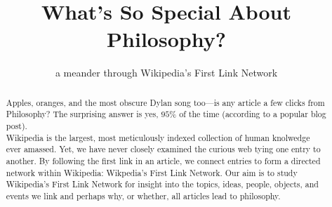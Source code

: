 \documentclass[twoside]{article}
\title{\vspace{-5mm}%
	\fontsize{24pt}{12pt}\selectfont
	\textbf{What's So Special About Philosophy?} 
	}
\author{
\fontsize{14pt}{14pt}\selectfont
	a meander through Wikipedia's First Link Network \vspace{-2mm}
	}
\date{}
\begin{document}
\maketitle
\thispagestyle{fancy}

\begin{abstract}
\fontsize{12pt}{12pt}\selectfont
\noindent Apples, oranges, and the most obscure Dylan song too---is any article a few clicks from Philosophy? The surprising answer is yes, $95\%$ of the time (according to a popular blog post).\\

Wikipedia is the largest, most meticulously indexed collection of human knolwedge ever amassed. Yet, we have never closely examined the curious web tying one entry to another. By following the first link in an article, we connect entries to form a directed network within Wikipedia: Wikpedia's First Link Network. Our aim is to study Wikipedia's First Link Network for insight into the topics, ideas, people, objects, and events we link and perhaps why, or whether, all articles lead to philosophy.


\end{abstract}
	
\end{document}
